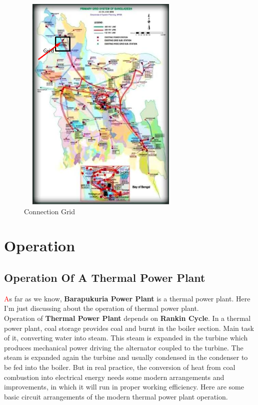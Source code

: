 \documentclass[11 pt]{article}
\begin{document}
\begin{figure}[h!]
\centering
\includegraphics[width=230pt,height=300pt]{Gallery/Grid.png}
\caption{Connection Grid}
\end{figure}

\pagebreak

\section{Operation}
\subsection{Operation Of A Thermal Power Plant}
{\huge\textcolor{red}{\hspace{5 mm}A}}s far as we know, \textbf{Barapukuria Power Plant} is a thermal power plant. Here I'm just discussing about the operation of thermal power plant.\\
Operation of \textbf{Thermal Power Plant} depends on \textbf{Rankin Cycle}. In a thermal power plant, coal storage provides coal and burnt in the boiler section. Main task of it, converting water into steam. This steam is expanded in the turbine which produces mechanical power driving the alternator coupled to the turbine. The steam is expanded again the turbine and usually condensed in the condenser to be fed into the boiler. But in real practice, the conversion of heat from coal combustion into electrical energy needs some modern arrangements and improvements, in which it will run in proper working efficiency. Here are some basic circuit arrangements of the modern thermal power plant operation.\\
\end{document}
